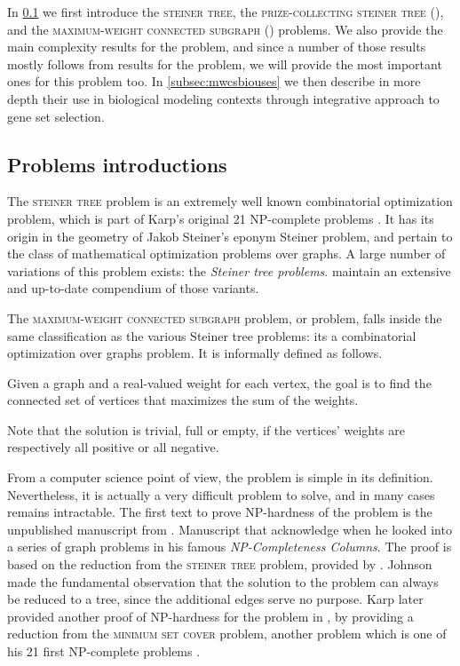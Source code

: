 	In \cref{subsec:mwcsintro} we first introduce the \textsc{steiner tree}, the \textsc{prize-collecting steiner tree} (\pcst{}), and the \textsc{maximum-weight connected subgraph} (\mwcs{}) problems.
	We also provide the main complexity results for the \mwcs{} problem, and since a number of those results mostly follows from results for the \pcst{} problem, we will provide the most important ones for this problem too.
	In \cref{subsec:mwcsbiouses} we then describe in more depth their use in biological modeling contexts through integrative approach to gene set selection.

	\subsection{Problems introductions}
	\label{subsec:mwcsintro}

	The \textsc{steiner tree} problem is an extremely well known combinatorial optimization problem, which is part of Karp's original 21 NP-complete problems \parencite{karp1972reducibility}.
	It has its origin in the geometry of Jakob Steiner's eponym Steiner problem, and pertain to the class of mathematical optimization problems over graphs.
	A large number of variations of this problem exists: the \emph{Steiner tree problems}.
	\Textcite{hauptmann2014compendium} maintain an extensive and up-to-date compendium of those variants.

	The \textsc{maximum-weight connected subgraph} problem, or \mwcs{} problem, falls inside the same classification as the various Steiner tree problems: its a combinatorial optimization over graphs problem.
	It is informally defined as follows.

	Given a graph and a real-valued weight for each vertex, the goal is to find the connected set of vertices that maximizes the sum of the weights.

	Note that the solution is trivial, full or empty, if the vertices' weights are respectively all positive or all negative.

	From a computer science point of view, the \mwcs{} problem is simple in its definition.
	Nevertheless, it is actually a very difficult problem to solve, and in many cases remains intractable.
	The first text to prove NP-hardness of the problem is the unpublished manuscript from \textcite{vergis1983manuscript}.
	Manuscript that \textcite[Section 5]{johnson1985np} acknowledge when he looked into a series of graph problems in his famous \emph{NP-Completeness Columns}.
	The proof is based on the reduction from the \textsc{steiner tree} problem, provided by \textcite{garey1979computers}.
	Johnson made the fundamental observation that the solution to the \mwcs{} problem can always be reduced to a tree, since the additional edges serve no purpose.
	Karp later provided another proof of NP-hardness for the \mwcs{} problem in \parencite[Supplementary Material]{ideker2002discovering}, by providing a reduction from the \textsc{minimum set cover} problem, another problem which is one of his 21 first NP-complete problems \parencite{karp1972reducibility}.

